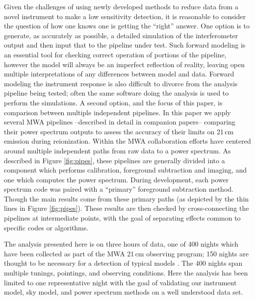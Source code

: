 \documentclass[twolcolumn,iop]{emulateapj}
\begin{document}
Given the challenges of using newly developed methods to reduce data from a novel instrument to make a low sensitivity detection, it is reasonable to consider the question of how one knows one is getting the ``right'' answer.  One option is to generate, as accurately as possible, a detailed simulation of the interferometer output and then input that to the pipeline under test.  Such forward modeling is an essential tool for checking correct operation of portions of the pipeline, however the model will always be an imperfect reflection of reality, leaving open multiple interpretations of any differences between model and data.  Forward modeling the instrument response is also difficult to divorce from the analysis pipeline being tested; often the same software doing the analysis is used to perform the simulations. A second option, and the focus of this paper, is comparison between multiple independent pipelines.%
In this paper we apply several MWA pipelines --described in detail in companion papers-- comparing their power spectrum outputs to assess the accuracy of their limits on 21\,cm emission during reionization.  Within the MWA collaboration efforts have centered around multiple independent paths from raw data to a power spectrum.  As described in Figure \ref{fig:pipes}, these pipelines are generally divided into a component which performs calibration, foreground subtraction and imaging, and one which computes the power spectrum.  During development, each power spectrum code was paired with a ``primary'' foreground subtraction method.  Though the main results come from these primary paths (as depicted by the thin lines in Figure \ref{fig:pipes}). These results are then checked by cross-connecting the pipelines at intermediate points, with the goal of separating effects common to specific codes or algorithms.

The analysis presented here is on three hours of data, one of 400 nights which have been collected as part of the MWA 21\,cm observing program; 150 nights are thought to be necessary for a detection of typical models \citep{Beardsley:2013p9952}. The 400 nights span multiple tunings, pointings, and observing conditions. Here the analysis has been limited to one representative night with the goal of validating our instrument model, sky model, and power spectrum methods on a well understood data set. 
\end{document}
